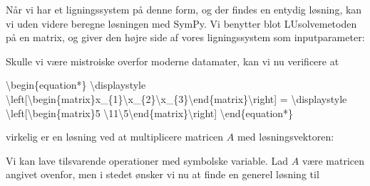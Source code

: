 \documentclass[letterpaper,10pt,english]{jupyterBook}
\begin{document}
Når vi har et ligningssystem på denne form, og der findes en entydig løsning, kan vi uden videre beregne løsningen med SymPy. Vi benytter blot LUsolve\sphinxhyphen{}metoden på en matrix, og giver den højre side af vores ligningssystem som inputparameter:

\begin{sphinxVerbatim}[commandchars=\\\{\}]
  \PYG{p}{[}\PYG{p}{[}  \PYG{p}{]} \PYG{p}{[}  \PYG{p}{]} \PYG{p}{[}  \PYG{p}{]}\PYG{p}{]}
  \PYG{p}{[}  \PYG{p}{]}

  
\end{sphinxVerbatim}

\noindent{}

Skulle vi være mistroiske overfor moderne datamater, kan vi nu verificere at

\textbackslash{}begin\{equation*\}
\textbackslash{}displaystyle \textbackslash{}left{[}\textbackslash{}begin\{matrix\}x\_\{1\}\textbackslash{}x\_\{2\}\textbackslash{}x\_\{3\}\textbackslash{}end\{matrix\}\textbackslash{}right{]} = \textbackslash{}displaystyle \textbackslash{}left{[}\textbackslash{}begin\{matrix\}5 \textbackslash{}11\textbackslash{}5\textbackslash{}end\{matrix\}\textbackslash{}right{]}
\textbackslash{}end\{equation*\}

virkelig er en løsning ved at multiplicere matricen \(A\) med løsningsvektoren:

\begin{sphinxVerbatim}[commandchars=\\\{\}]
  
\end{sphinxVerbatim}

\noindent{}

Vi kan lave tilsvarende operationer med symbolske variable. Lad \(A\) være matricen angivet ovenfor, men i stedet ønsker vi nu at finde en generel løsning til
\end{document}
